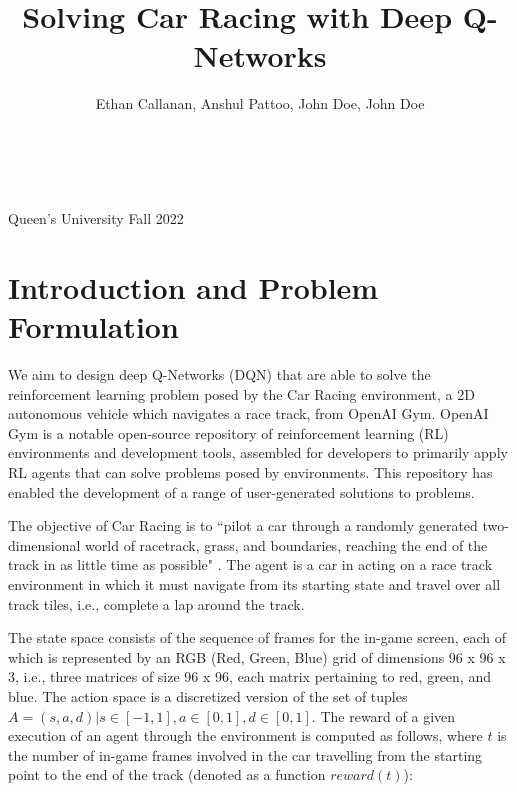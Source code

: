 \documentclass{article}
\title{\large Solving Car Racing with Deep Q-Networks}
\author{\large Ethan Callanan, Anshul Pattoo, John Doe, John Doe}
\begin{document}


\makeatletter
    \begin{titlepage}
        \begin{center}
        \vbox{}\vspace{5cm}
            {\@title }\\[3cm] 
            {\@author}\\[0.5cm]
            {\large Queen's University}
            \null
            \vfill 
            {\large Fall 2022}
        \end{center}
    \end{titlepage}
\makeatother

\newpage
\section{Introduction and Problem Formulation}

We aim to design deep Q-Networks (DQN) that are able to solve the reinforcement learning problem posed by the Car Racing environment, a 2D autonomous vehicle which navigates a race track, from OpenAI Gym. OpenAI Gym is a notable open-source repository of reinforcement learning (RL) environments and development tools, assembled for developers to primarily apply RL agents that can solve problems posed by environments. This repository has enabled the development of a range of user-generated solutions to problems. 

The objective of Car Racing is to ``pilot a car through a randomly generated two-dimensional world of racetrack, grass, and boundaries, reaching the end of the track in as little time as possible" \cite{rl_simple_racing}. The agent is a car in acting on a race track environment in which it must navigate from its starting state and travel over all track tiles, i.e., complete a lap around the track. 

The state space consists of the sequence of frames for the in-game screen, each of which is represented by an RGB (Red, Green, Blue) grid of dimensions 96 x 96 x 3, i.e., three matrices of size 96 x 96, each matrix pertaining to red, green, and blue. The action space is a discretized version of the set of tuples $A = (s, a, d) | s \in [-1, 1], a \in [0, 1], d \in [0, 1]$. The reward of a given execution of an agent through the environment is computed as follows, where $t$ is the number of in-game frames involved in the car travelling from the starting point to the end of the track (denoted as a function $reward(t)$):
\end{document}
